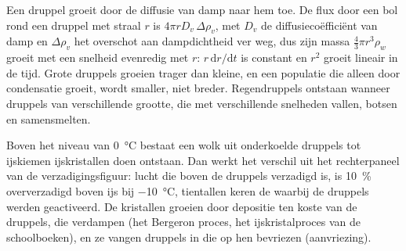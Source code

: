 \begin{remark}\label{rem:b2:atmospheric-thermodynamics:growth}
Een druppel groeit door de diffusie van damp naar hem toe. De flux door een bol rond een druppel
met straal $r$ is $4\pi r D_v\,\Delta\rho_v$, met $D_v$ de diffusiecoëfficiënt van damp en
$\Delta\rho_v$ het overschot aan dampdichtheid ver weg, dus zijn massa $\tfrac43\pi r^3\rho_w$ groeit
met een snelheid evenredig met $r$: $r\,\mathrm{d}r/\mathrm{d}t$ is constant en $r^2$ groeit lineair in
de tijd. Grote druppels groeien trager dan kleine, en een populatie die alleen door condensatie
groeit, wordt smaller, niet breder. Regendruppels ontstaan wanneer druppels van verschillende grootte, die met
verschillende snelheden vallen, botsen en samensmelten.
\end{remark}

Boven het niveau van \qty{0}{\celsius} bestaat een wolk uit onderkoelde druppels tot ijskiemen
ijskristallen doen ontstaan. Dan werkt het verschil uit het rechterpaneel van de
verzadigingsfiguur: lucht die boven de druppels verzadigd is, is \qty{10}{\percent} oververzadigd boven
ijs bij \qty{-10}{\celsius}, tientallen keren de  waarbij de druppels werden geactiveerd.
De kristallen groeien door depositie ten koste van de druppels, die verdampen (het Bergeron%
proces, het ijskristalproces van de schoolboeken), en ze vangen druppels in die op hen
bevriezen (aanvriezing).

